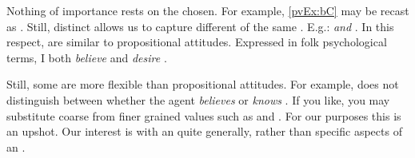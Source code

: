 \begin{note}
    \noindent%
    Nothing of importance rests on the  chosen.
    For example, \ref{pvEx:bC} may be recast as .
    Still, distinct  allows us to capture different  of the same .
    E.g.:  \emph{and} .
    In this respect, \evalN{} are similar to propositional attitudes.
    Expressed in folk psychological terms, I both \emph{believe}  and \emph{desire} .

    Still, some  are more flexible than propositional attitudes.
    For example,  does not distinguish between whether the agent \emph{believes} or \emph{knows} .
    If you like, you may substitute coarse  from finer grained values such as  and .
    For our purposes this is an upshot.
    Our interest is with an \agpe{} quite generally, rather than specific aspects of an \agpe{}.
  \end{note}

